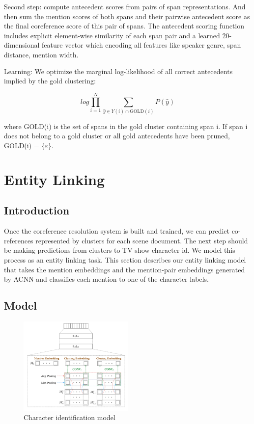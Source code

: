 \documentclass[11pt]{article}
\begin{document}
Second step: compute antecedent scores from pairs of span representations. And then sum the mention scores of both spans and their pairwise antecedent score as the final coreference score of this pair of spans.
The antecedent scoring function includes explicit element-wise similarity of each span pair and a learned 20-dimensional feature vector which encoding all features like speaker genre, span distance, mention width.

Learning: We optimize the marginal log-likelihood of all correct antecedents implied by the gold clustering:

\begin{equation}
log\prod^{N}_{i=1}\sum_{\widehat{y}\in Y(i)\cap \text{GOLD}(i)}P(\widehat{y})
\end{equation}


where GOLD(i) is the set of spans in the gold cluster containing span i. If span i does not belong to a gold cluster or all gold antecedents have been pruned, GOLD(i) = \{$\varepsilon $\}.


\section{Entity Linking}

\subsection{Introduction}
Once the coreference resolution system is built and trained, we can predict co-references represented by clusters for each scene document. The next step should be making predictions from clusters to TV show character id. We model this process as an entity linking task. This section describes our entity linking model that takes the mention embeddings and the mention-pair embeddings generated by ACNN and classifies each mention to one of the character labels.

\subsection{Model}
\begin{figure}[h]                
 \includegraphics[width=0.5\textwidth]{05.jpg}
 \caption{Character identification model}             
\end{figure}
\end{document}
